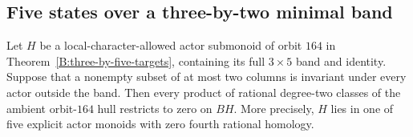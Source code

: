 \subsection{Five states over a three-by-two minimal band}

\begin{lemma}
\label{C:3x5-small-invariant-columns}
Let $H$ be a local-character-allowed actor submonoid of orbit $164$
in Theorem~\ref{B:three-by-five-targets}, containing its full
$3\times5$ band and identity.  Suppose that a nonempty subset of
at most two columns is invariant under every actor outside the
band.  Then every product of rational degree-two classes of the
ambient orbit-$164$ hull restricts to zero on $BH$.
More precisely, $H$ lies in one of five
explicit actor monoids with zero fourth rational homology.
\end{lemma}
